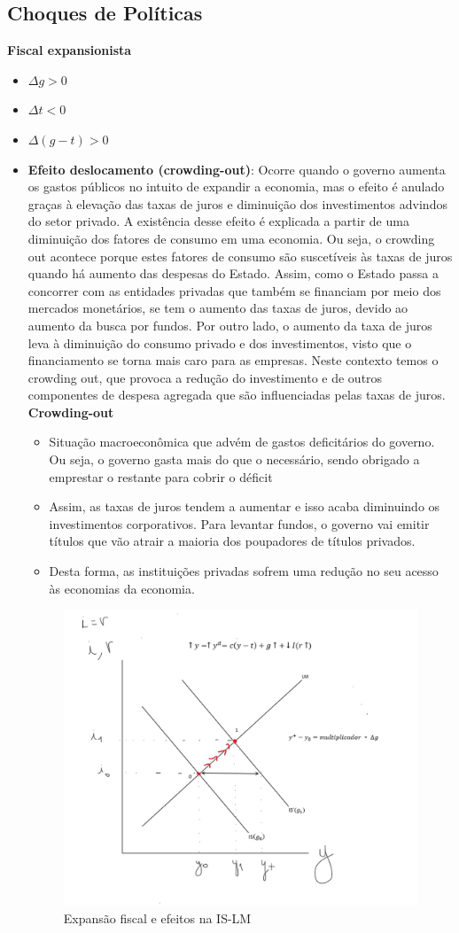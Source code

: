 \documentclass[a4paper,12pt]{article}[abntex2]
\begin{document}
\subsection{\textbf{Choques de Políticas}}
\textbf{Fiscal expansionista }\begin{itemize}
    \item $\Delta g>0$
    \item $\Delta t<0$
    \item $\Delta(g-t)>0$
    \item \textbf{Efeito deslocamento (crowding-out)}: Ocorre quando o governo aumenta os gastos públicos no intuito de expandir a economia, mas o efeito é anulado graças à elevação das taxas de juros e diminuição dos investimentos advindos do setor privado. A existência desse efeito é explicada a partir de uma diminuição dos fatores de consumo em uma economia. Ou seja, o crowding out acontece porque estes fatores de consumo são suscetíveis às taxas de juros quando há aumento das despesas do Estado. Assim, como o Estado passa a concorrer com as entidades privadas que também se financiam por meio dos mercados monetários, se tem o aumento das taxas de juros, devido ao aumento da busca por fundos. Por outro lado, o aumento da taxa de juros leva à diminuição do consumo privado e dos investimentos, visto que o financiamento se torna mais caro para as empresas. Neste contexto temos o crowding out, que provoca a redução do investimento e de outros componentes de despesa agregada que são influenciadas pelas taxas de juros. \textbf{Crowding-out}\begin{itemize}
        \item Situação macroeconômica que advém de gastos deficitários do governo. Ou seja, o governo gasta mais do que o necessário, sendo obrigado a emprestar o restante para cobrir o déficit
        \item Assim, as taxas de juros tendem a aumentar e isso acaba diminuindo os investimentos corporativos. Para levantar fundos, o governo vai emitir títulos que vão atrair a maioria dos poupadores de títulos privados.
        \item Desta forma, as instituições privadas sofrem uma redução no seu acesso às economias da economia.
    \end{itemize}
    \begin{figure}[H]
        \caption{Expansão fiscal e efeitos na IS-LM}
        \centering
        \includegraphics[width=0.7\linewidth]{Imagens/a4i3.png}

\end{figure}
\end{itemize}
\end{document}
